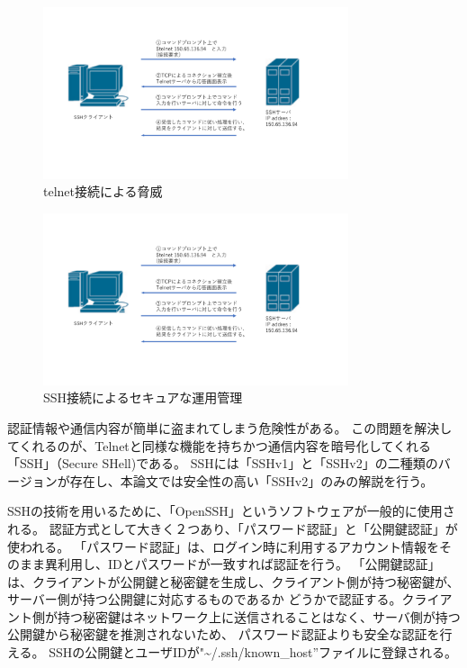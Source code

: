 \documentclass[12pt,a4paper,titlepage]{jsarticle}
\begin{document}
\begin{figure}[h]
    \centering
    \includegraphics[width=0.8\textwidth, page=3]{graphs/network_archtecture.pdf}
    \caption{telnet接続による脅威}
    \label{telnet_flow}
\end{figure}
\begin{figure}[h]
    \centering
    \includegraphics[width=0.8\textwidth, page=4]{graphs/network_archtecture.pdf}
    \caption{SSH接続によるセキュアな運用管理}
    \label{SSH_security}
\end{figure}

認証情報や通信内容が簡単に盗まれてしまう危険性がある。
この問題を解決してくれるのが、Telnetと同様な機能を持ちかつ通信内容を暗号化してくれる「SSH」（Secure SHell)である。
SSHには「SSHv1」と「SSHv2」の二種類のバージョンが存在し、本論文では安全性の高い「SSHv2」のみの解説を行う。




SSHの技術を用いるために、「OpenSSH」というソフトウェアが一般的に使用される。
認証方式として大きく２つあり、「パスワード認証」と「公開鍵認証」が使われる。
「パスワード認証」は、ログイン時に利用するアカウント情報をそのまま異利用し、IDとパスワードが一致すれば認証を行う。
「公開鍵認証」は、クライアントが公開鍵と秘密鍵を生成し、クライアント側が持つ秘密鍵が、サーバー側が持つ公開鍵に対応するものであるか
どうかで認証する。クライアント側が持つ秘密鍵はネットワーク上に送信されることはなく、サーバ側が持つ公開鍵から秘密鍵を推測されないため、
パスワード認証よりも安全な認証を行える。
SSHの公開鍵とユーザIDが"\textasciitilde/.ssh/known\_host''ファイルに登録される。
\end{document}
